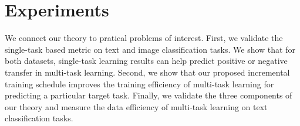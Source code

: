 \section{Experiments}

We connect our theory to pratical problems of interest.
First, we validate the single-task based metric on text and image classification tasks.
We show that for both datasets, single-task learning results can help predict positive or negative transfer in multi-task learning.
Second, we show that our proposed incremental training schedule improves the training efficiency of multi-task learning for predicting a particular target task.
Finally, we validate the three components of our theory and measure the data efficiency of multi-task learning on text classification tasks.

